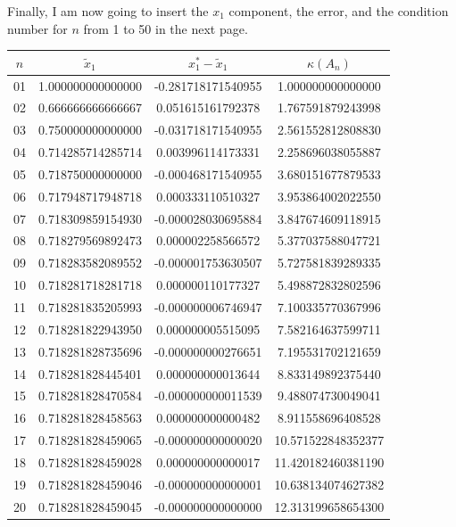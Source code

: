 \documentclass{article}
\begin{document}
Finally, I am now going to insert the $x_1$ component, the error, and the condition number for $n$ from 1 to 50 in the next page.
\begin{table}[htb]
\centering %
\begin{tabular}{c c c c} %
$n$ & $\widetilde{x}_1$ & $x_1^{\ast}- \widetilde{x}_1$ & $\kappa(A_n)$ \\ [0.65ex] %
\hline %
01 & 1.000000000000000 & -0.281718171540955 & 1.000000000000000 \\
02 & 0.666666666666667 & 0.051615161792378 & 1.767591879243998 \\
03 & 0.750000000000000 & -0.031718171540955 & 2.561552812808830 \\
04 & 0.714285714285714 & 0.003996114173331 & 2.258696038055887 \\
05 & 0.718750000000000 & -0.000468171540955 & 3.680151677879533 \\
06 & 0.717948717948718 & 0.000333110510327 & 3.953864002022550 \\
07 & 0.718309859154930 & -0.000028030695884 & 3.847674609118915 \\
08 & 0.718279569892473 & 0.000002258566572 & 5.377037588047721 \\
09 & 0.718283582089552 & -0.000001753630507 & 5.727581839289335 \\
10 & 0.718281718281718 & 0.000000110177327 & 5.498872832802596 \\
11 & 0.718281835205993 & -0.000000006746947 & 7.100335770367996 \\
12 & 0.718281822943950 & 0.000000005515095 & 7.582164637599711 \\
13 & 0.718281828735696 & -0.000000000276651 & 7.195531702121659 \\
14 & 0.718281828445401 & 0.000000000013644 & 8.833149892375440 \\
15 & 0.718281828470584 & -0.000000000011539 & 9.488074730049041 \\
16 & 0.718281828458563 & 0.000000000000482 & 8.911558696408528 \\
17 & 0.718281828459065 & -0.000000000000020 & 10.571522848352377 \\
18 & 0.718281828459028 & 0.000000000000017 & 11.420182460381190 \\
19 & 0.718281828459046 & -0.000000000000001 & 10.638134074627382 \\
20 & 0.718281828459045 & -0.000000000000000 & 12.313199658654300 \\

\end{tabular}
\end{table}
\end{document}
